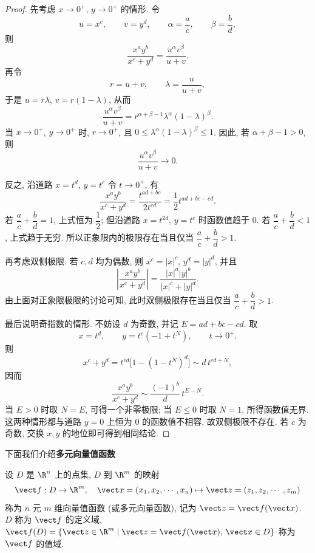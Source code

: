 \begin{proof}
	先考虑 $x\to0^+$, $y\to0^+$ 的情形. 令
	\[
	u=x^c,\qquad v=y^d,\qquad
	\alpha=\frac{a}{c},\qquad \beta=\frac{b}{d},
	\]
	则
	\[
	\frac{x^ay^b}{x^c+y^d}
	=
	\frac{u^\alpha v^\beta}{u+v}.
	\]
	再令
	\[
	r=u+v,\qquad \lambda=\frac{u}{u+v},
	\]
	于是 $u=r\lambda$, $v=r(1-\lambda)$, 从而
	\[
	\frac{u^\alpha v^\beta}{u+v}
	=
	r^{\alpha+\beta-1}\lambda^\alpha(1-\lambda)^\beta.
	\]
	当 $x\to0^+$, $y\to0^+$ 时, $r\to0^+$, 且
	$0\leq\lambda^\alpha(1-\lambda)^\beta\leq1$. 因此, 若
	$\alpha+\beta-1>0$, 则
	\[
	\frac{u^\alpha v^\beta}{u+v}\to0.
	\]
	
	反之, 沿道路 $x=t^d$, $y=t^c$ 令 $t\to0^+$, 有
	\[
	\frac{x^ay^b}{x^c+y^d}
	=
	\frac{t^{ad+bc}}{2t^{cd}}
	=
	\frac12t^{ad+bc-cd}.
	\]
	若 $\dfrac{a}{c}+\dfrac{b}{d}=1$, 上式恒为 $\dfrac12$;
	但沿道路 $x=t^{2d}$, $y=t^c$ 时函数值趋于 $0$. 若
	$\dfrac{a}{c}+\dfrac{b}{d}<1$, 上式趋于无穷.
	所以正象限内的极限存在当且仅当
	$\dfrac{a}{c}+\dfrac{b}{d}>1$.
	
	再考虑双侧极限. 若 $c,d$ 均为偶数, 则
	$x^c=|x|^c$, $y^d=|y|^d$, 并且
	\[
	\left|\frac{x^ay^b}{x^c+y^d}\right|
	=
	\frac{|x|^a|y|^b}{|x|^c+|y|^d}.
	\]
	由上面对正象限极限的讨论可知, 此时双侧极限存在当且仅当
	$\dfrac{a}{c}+\dfrac{b}{d}>1$.
	
	最后说明奇指数的情形. 不妨设 $d$ 为奇数, 并记
	$E=ad+bc-cd$. 取
	\[
	x=t^d,\qquad y=t^c(-1+t^N),\qquad t\to0^+.
	\]
	则
	\[
	x^c+y^d
	=
	t^{cd}\bigl[1-(1-t^N)^d\bigr]
	\sim d\,t^{cd+N},
	\]
	因而
	\[
	\frac{x^ay^b}{x^c+y^d}
	\sim\frac{(-1)^b}{d}\,t^{E-N}.
	\]
	当 $E>0$ 时取 $N=E$, 可得一个非零极限; 当 $E\leq0$
	时取 $N=1$, 所得函数值无界. 这两种情形都与道路 $y=0$
	上恒为 $0$ 的函数值不相容, 故双侧极限不存在. 若 $c$ 为奇数,
	交换 $x,y$ 的地位即可得到相同结论.
\end{proof}
下面我们介绍\textbf{多元向量值函数}
\begin{definition}
	设 $D$ 是 $\R^n$ 上的点集, $D$ 到 $\R^m$ 的映射
	\[
	\vect f: D \to \R^m, \quad \vect x = (x_1, x_2, \cdots, x_n) \mapsto \vect z = (z_1, z_2, \cdots, z_m)
	\]
	称为 $n$ 元 $m$ 维向量值函数 (或多元向量函数), 记为 $\vect z = \vect f(\vect x)$. $D$ 称为 $\vect f$ 的定义域, $\vect f(D) = \{ \vect z \in \R^m \mid \vect z = \vect f(\vect x),\, \vect x \in D \}$ 称为 $\vect f$ 的值域.

\end{definition}

